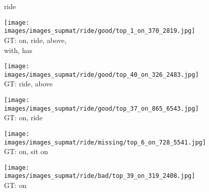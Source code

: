 \documentclass[10pt,twocolumn,letterpaper]{article}
\begin{document}
\begin{figure*}[t]
	\begin{minipage}[t]{0.005\textwidth}
    	\centering
    	\vspace{-8.5ex}
    	\begin{turn}{90}
    	ride
    	\end{turn}
    	\vspace{2ex}
    \end{minipage}
    \hspace{0.01\textwidth}
    \begin{minipage}[t]{0.18\textwidth}
    	\centering
       	\texttt{[image: images/images\_supmat/ride/good/top\_1\_on\_370\_2819.jpg]}\\
       	\vspace{0.3ex}
       	GT: on, ride, above,\\
       	with, has
       	\vspace{2ex}
    \end{minipage}
    \hspace{0.005\textwidth}
    \begin{minipage}[t]{0.18\textwidth}
    	\centering
       	\texttt{[image: images/images\_supmat/ride/good/top\_40\_on\_326\_2483.jpg]}\\
       	\vspace{0.3ex}
       	GT: ride, above
       	\vspace{0.2ex}
    \end{minipage}
    \hspace{0.005\textwidth}
    \begin{minipage}[t]{0.18\textwidth}
    	\centering
       	\texttt{[image: images/images\_supmat/ride/good/top\_37\_on\_865\_6543.jpg]}\\
       	\vspace{0.3ex}
       	GT: on, ride
       	\vspace{0.2ex}
    \end{minipage}
    \hspace{0.005\textwidth}  
    \begin{minipage}[t]{0.18\textwidth}
    	\centering
       	\texttt{[image: images/images\_supmat/ride/missing/top\_6\_on\_728\_5541.jpg]}\\
       	\vspace{0.3ex}
       	GT: on, sit on
       	\vspace{0.2ex}
    \end{minipage}
    \hspace{0.005\textwidth}  
    \begin{minipage}[t]{0.18\textwidth}
    	\centering
       	\texttt{[image: images/images\_supmat/ride/bad/top\_39\_on\_319\_2408.jpg]}\\
       	\vspace{0.3ex}
       	GT: on
      	\vspace{0.2ex}
    \end{minipage} 
    

\end{figure*}
\end{document}
